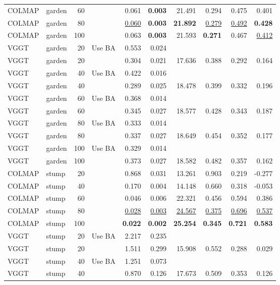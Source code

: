 \begin{table}[H]
\begin{tabular}{llrlrrrrrr}
COLMAP & garden & 60 &  & 0.061 & \textbf{0.003} & 21.491 & 0.294 & 0.475 & 0.401 \\
COLMAP & garden & 80 &  & \underline{0.060} & \textbf{0.003} & \textbf{21.892} & \underline{0.279} & \underline{0.492} & \textbf{0.428} \\
COLMAP & garden & 100 &  & 0.063 & \textbf{0.003} & 21.593 & \textbf{0.271} & 0.467 & \underline{0.412} \\
VGGT & garden & 20 & Use BA & 0.553 & 0.024 &  &  &  &  \\
VGGT & garden & 20 &  & 0.304 & 0.021 & 17.636 & 0.388 & 0.292 & 0.164 \\
VGGT & garden & 40 & Use BA & 0.422 & 0.016 &  &  &  &  \\
VGGT & garden & 40 &  & 0.289 & 0.025 & 18.478 & 0.399 & 0.332 & 0.196 \\
VGGT & garden & 60 & Use BA & 0.368 & 0.014 &  &  &  &  \\
VGGT & garden & 60 &  & 0.345 & 0.027 & 18.577 & 0.428 & 0.343 & 0.187 \\
VGGT & garden & 80 & Use BA & 0.333 & 0.014 &  &  &  &  \\
VGGT & garden & 80 &  & 0.337 & 0.027 & 18.649 & 0.454 & 0.352 & 0.177 \\
VGGT & garden & 100 & Use BA & 0.329 & 0.014 &  &  &  &  \\
VGGT & garden & 100 &  & 0.373 & 0.027 & 18.582 & 0.482 & 0.357 & 0.162 \\
\midrule
COLMAP & stump & 20 &  & 0.868 & 0.031 & 13.261 & 0.903 & 0.219 & -0.277 \\
COLMAP & stump & 40 &  & 0.170 & 0.004 & 14.148 & 0.660 & 0.318 & -0.053 \\
COLMAP & stump & 60 &  & 0.046 & 0.006 & 22.321 & 0.456 & 0.594 & 0.386 \\
COLMAP & stump & 80 &  & \underline{0.028} & \underline{0.003} & \underline{24.567} & \underline{0.375} & \underline{0.696} & \underline{0.537} \\
COLMAP & stump & 100 &  & \textbf{0.022} & \textbf{0.002} & \textbf{25.254} & \textbf{0.345} & \textbf{0.721} & \textbf{0.583} \\
VGGT & stump & 20 & Use BA & 2.217 & 0.235 &  &  &  &  \\
VGGT & stump & 20 &  & 1.511 & 0.299 & 15.908 & 0.552 & 0.288 & 0.029 \\
VGGT & stump & 40 & Use BA & 1.251 & 0.073 &  &  &  &  \\
VGGT & stump & 40 &  & 0.870 & 0.126 & 17.673 & 0.509 & 0.353 & 0.126 \\

\end{tabular}
\end{table}
